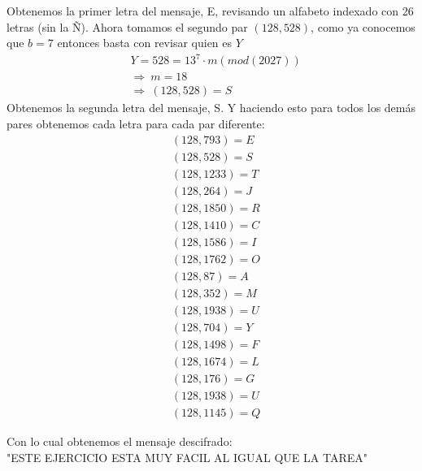 \documentclass[12pt, letterpaper]{article}
\begin{document}
\begin{itemize}
Obtenemos la primer letra del mensaje, E, revisando un alfabeto indexado con 26 letras (sin la Ñ). Ahora tomamos el segundo par $(128, 528)$, como ya conocemos que $b = 7$ entonces basta con revisar quien es $Y$
\begin{equation*}
\begin{split}
&Y = 528 = 13^7\cdot m (mod (2027))\\
&\Rightarrow\ m = 18\\
&\Rightarrow\ (128, 528) = S
\end{split}
\end{equation*}
Obtenemos la segunda letra del mensaje, S. Y haciendo esto para todos los demás pares obtenemos cada letra para cada par diferente:
\begin{equation*}
\begin{split}
&(128, 793) = E\\
&(128, 528) = S\\
&(128, 1233) = T\\
&(128, 264) = J\\
&(128, 1850) = R\\
&(128, 1410) = C\\
&(128, 1586) = I\\
&(128, 1762) = O\\
&(128, 87) = A\\
&(128, 352) = M\\
&(128, 1938) = U\\
&(128, 704) = Y\\
&(128, 1498) = F\\
&(128, 1674) = L \\
&(128, 176) = G\\
&(128, 1938) = U\\
&(128, 1145) = Q
\end{split}
\end{equation*}

Con lo cual obtenemos el mensaje descifrado:\\

"ESTE EJERCICIO ESTA MUY FACIL AL IGUAL QUE LA TAREA"
\end{itemize}
\end{document}
